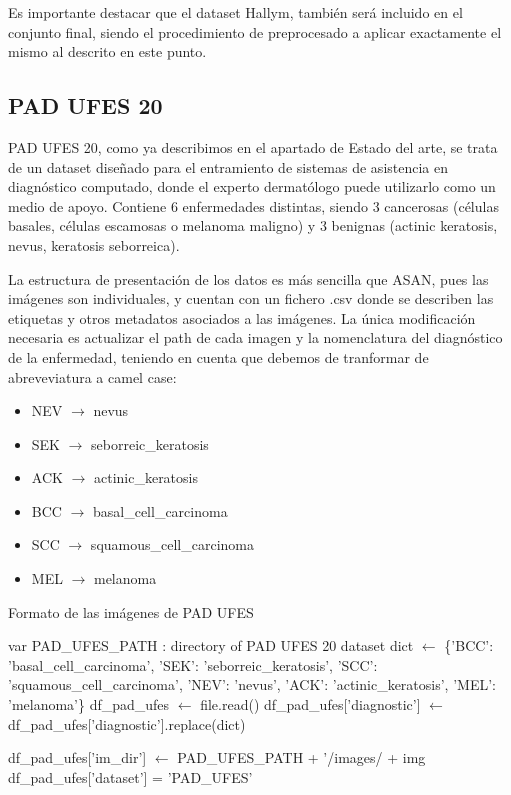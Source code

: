 Es importante destacar que el dataset Hallym, también será incluido en el conjunto final, siendo el procedimiento de preprocesado a aplicar exactamente el mismo al descrito en este punto.

\subsection{PAD UFES 20}

PAD UFES 20, como ya describimos en el apartado de Estado del arte, se trata de un dataset diseñado para el entramiento de sistemas de asistencia en diagnóstico computado, donde el experto dermatólogo puede utilizarlo como un medio de apoyo. Contiene 6 enfermedades distintas, siendo 3 cancerosas (células basales, células escamosas o melanoma maligno) y 3 benignas (actinic keratosis, nevus, keratosis seborreica).

La estructura de presentación de los datos es más sencilla que ASAN, pues las imágenes son individuales, y cuentan con un fichero .csv donde se describen las etiquetas y otros metadatos asociados a las imágenes. La única modificación necesaria es actualizar el path de cada imagen y la nomenclatura del diagnóstico de la enfermedad, teniendo en cuenta que debemos de tranformar de abreveviatura a camel case:
\begin{itemize}
	\item NEV $\rightarrow$ nevus
	\item SEK  $\rightarrow$ seborreic\_keratosis 
	\item ACK $\rightarrow$ actinic\_keratosis  
	\item BCC $\rightarrow$  basal\_cell\_carcinoma           
	\item SCC $\rightarrow$ squamous\_cell\_carcinoma
	\item MEL $\rightarrow$ melanoma
	         
\end{itemize}



\begin{algorithm}
	\label{cortarpadufes}
	\caption{Formato de las imágenes de PAD UFES}
	\begin{algorithmic}
		\State  var PAD\_UFES\_PATH : directory of PAD UFES 20 dataset
		\State dict $\gets$ \{'BCC': 'basal\_cell\_carcinoma', 'SEK': 'seborreic\_keratosis', 'SCC': 'squamous\_cell\_carcinoma', 'NEV': 'nevus',
			'ACK': 'actinic\_keratosis', 'MEL': 'melanoma'\}
		\State df\_pad\_ufes $\gets$ file.read()
		\State  df\_pad\_ufes['diagnostic'] $\gets$ df\_pad\_ufes['diagnostic'].replace(dict)
		
			\State df\_pad\_ufes['im\_dir'] $\gets$  PAD\_UFES\_PATH + '/images/ + img
		   \State df\_pad\_ufes['dataset'] = 'PAD\_UFES'
	
	\EndFor		
		\EndProcedure
	\end{algorithmic}
\end{algorithm}

